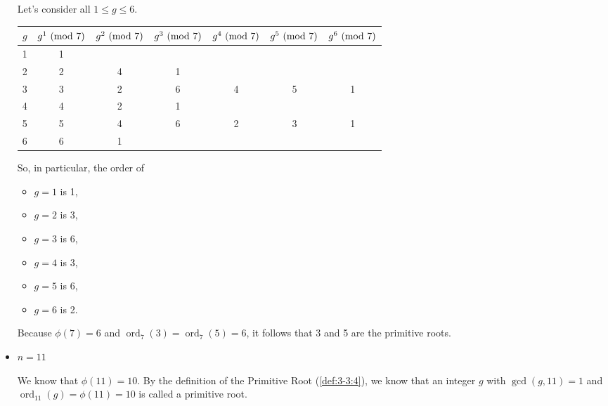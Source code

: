 \documentclass[letterpaper]{article}
\DeclareMathOperator{\ord}{ord}
\begin{document}
\begin{mdframed}
\begin{itemize}
\begin{mdframed}
            \bigskip 

            Let's consider all $1 \leq g \leq 6$.
            \begin{center}
                \begin{tabular}{|c|c c c c c c|}
                    \hline 
                    $g$ & $g^1 \ (\mathrm{mod}\ 7)$ & $g^2 \ (\mathrm{mod}\ 7)$ & $g^3 \ (\mathrm{mod}\ 7)$ & $g^4 \ (\mathrm{mod}\ 7)$ & $g^5 \ (\mathrm{mod}\ 7)$ & $g^6 \ (\mathrm{mod}\ 7)$ \\ 
                    \hline 
                    1   & 1           &                 &               &                &              &               \\ 
                    2   & 2           & 4               & 1             &                &              &               \\ 
                    3   & 3           & 2               & 6             & 4              & 5            & 1             \\ 
                    4   & 4           & 2               & 1             &                &              &               \\ 
                    5   & 5           & 4               & 6             & 2              & 3            & 1             \\ 
                    6   & 6           & 1               &               &                &              &               \\ 
                    \hline 
                \end{tabular}
            \end{center}

            So, in particular, the order of  
            \begin{itemize}
                \item $g = 1$ is 1, 
                \item $g = 2$ is 3, 
                \item $g = 3$ is 6,
                \item $g = 4$ is 3, 
                \item $g = 5$ is 6,
                \item $g = 6$ is 2.
            \end{itemize}
            Because $\phi(7) = 6$ and $\ord_{7}(3) = \ord_{7}(5) = 6$, it follows that 3 and 5 are the primitive roots. 
        \end{mdframed}
        \item $n = 11$
        \begin{mdframed}
            We know that $\phi(11) = 10$. By the definition of the Primitive Root (\ref{def:3-3:4}), we know that an integer $g$ with $\gcd(g, 11) = 1$ and $\ord_{11}(g) = \phi(11) = 10$ is called a primitive root.
            

\end{mdframed}
\end{itemize}
\end{mdframed}
\end{document}
